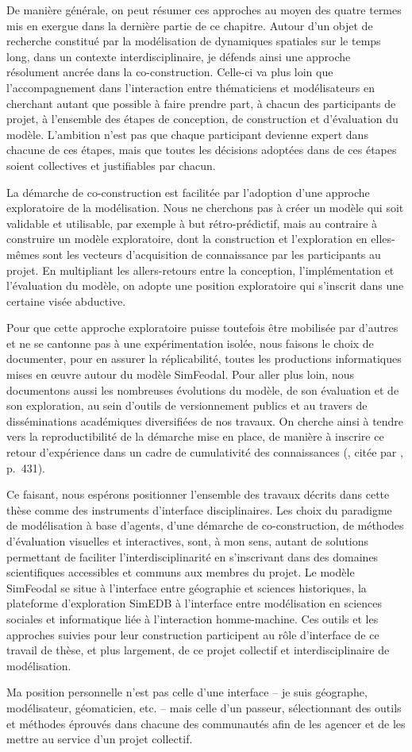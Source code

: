 De manière générale, on peut résumer ces approches au moyen des quatre termes mis en exergue dans la dernière partie de ce chapitre.
Autour d'un objet de recherche constitué par la modélisation de dynamiques spatiales sur le temps long, dans un contexte interdisciplinaire, je défends ainsi une approche résolument ancrée dans la co-construction.
Celle-ci va plus loin que l'accompagnement dans l'interaction entre \og thématiciens\fg{} et \og modélisateurs\fg{} en cherchant autant que possible à faire prendre part, à chacun des participants de projet, à l'ensemble des étapes de conception, de construction et d'évaluation du modèle.
L'ambition n'est pas que chaque participant devienne expert dans chacune de ces étapes, mais que toutes les décisions adoptées dans de ces étapes soient collectives et justifiables par chacun.

La démarche de co-construction est facilitée par l'adoption d'une approche exploratoire de la modélisation.
Nous ne cherchons pas à créer un modèle qui soit validable et utilisable, par exemple à but rétro-prédictif, mais au contraire à construire un modèle exploratoire, dont la construction et l'exploration en elles-mêmes sont les vecteurs d'acquisition de connaissance par les participants au projet.
En multipliant les allers-retours entre la conception, l'implémentation et l'évaluation du modèle, on adopte une position exploratoire qui s'inscrit dans une certaine visée abductive.

Pour que cette approche exploratoire puisse toutefois être mobilisée par d'autres et ne se cantonne pas à une expérimentation isolée, nous faisons le choix de documenter, pour en assurer la réplicabilité, toutes les productions informatiques mises en œuvre autour du modèle SimFeodal.
Pour aller plus loin, nous documentons aussi les nombreuses évolutions du modèle, de son évaluation et de son exploration, au sein d'outils de versionnement publics et au travers de disséminations académiques diversifiées de nos travaux.
On cherche ainsi à tendre vers la reproductibilité de la démarche mise en place, de manière à inscrire ce retour d'expérience dans un cadre de cumulativité des connaissances (\textcite{pumain_cumulativite_2005}, citée par \textcite{reycoyrehourcq:hal-01677950}, p.~431).

Ce faisant, nous espérons positionner l'ensemble des travaux décrits dans cette thèse comme des instruments d'interface disciplinaires.
Les choix du paradigme de modélisation à base d'agents, d'une démarche de co-construction, de méthodes d'évaluation visuelles et interactives, sont, à mon sens, autant de solutions permettant de faciliter l'interdisciplinarité en s'inscrivant dans des domaines scientifiques accessibles et communs aux membres du projet.
Le modèle SimFeodal se situe à l'interface entre géographie et sciences historiques, la plateforme d'exploration SimEDB à l'interface entre modélisation en sciences sociales et informatique liée à l'interaction homme-machine.
Ces outils et les approches suivies pour leur construction participent au rôle d'interface de ce travail de thèse, et plus largement, de ce projet collectif et interdisciplinaire de modélisation.

Ma position personnelle n'est pas celle d'une interface -- je suis géographe, modélisateur, géomaticien, etc. -- mais celle d'un passeur, sélectionnant des outils et méthodes éprouvés dans chacune des communautés afin de les agencer et de les mettre au service d'un projet collectif.
